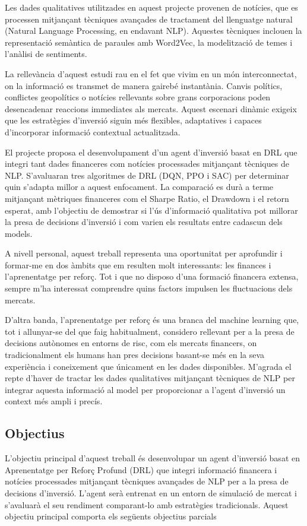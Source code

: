 \documentclass[12pt,a4paper,twoside]{book}
\begin{document}
Les dades qualitatives utilitzades en aquest projecte provenen de notícies, que es processen mitjançant tècniques avançades de tractament del llenguatge natural (Natural Language Processing, en endavant NLP). Aquestes tècniques inclouen la representació semàntica de paraules amb Word2Vec, la modelització de temes i l'anàlisi de sentiments.

La rellevància d'aquest estudi rau en el fet que vivim en un món interconnectat, on la informació es transmet de manera gairebé instantània. Canvis polítics, conflictes geopolítics o notícies rellevants sobre grans corporacions poden desencadenar reaccions immediates als mercats. Aquest escenari dinàmic exigeix que les estratègies d'inversió siguin més flexibles, adaptatives i capaces d'incorporar informació contextual actualitzada.

El projecte proposa el desenvolupament d'un agent d'inversió basat en DRL que integri tant dades financeres com notícies processades mitjançant tècniques de NLP. S'avaluaran tres algoritmes de DRL (DQN, PPO i SAC) per determinar quin s'adapta millor a aquest enfocament. La comparació es durà a terme mitjançant mètriques financeres com el Sharpe Ratio, el Drawdown i el retorn esperat, amb l'objectiu de demostrar si l'ús d'informació qualitativa pot millorar la presa de decisions d'inversió i com varien els resultats entre cadascun dels models.

A nivell personal, aquest treball representa una oportunitat per aprofundir i formar-me en dos àmbits que em resulten molt interessants: les finances i l'aprenentatge per reforç. Tot i que no disposo d'una formació financera extensa, sempre m'ha interessat comprendre quins factors impulsen les fluctuacions dels mercats.

D'altra banda, l'aprenentatge per reforç és una branca del machine learning que, tot i allunyar-se del que faig habitualment, considero rellevant per a la presa de decisions autònomes en entorns de risc, com els mercats financers, on tradicionalment els humans han pres decisions basant-se més en la seva experiència i coneixement que únicament en les dades disponibles. M'agrada el repte d'haver de tractar les dades qualitatives mitjançant tècniques de NLP per integrar aquesta informació al model per proporcionar a l'agent d'inversió un context més ampli i precís.

\subsection{Objectius}
L'objectiu principal d'aquest treball és desenvolupar un agent d'inversió basat en Aprenentatge per Reforç Profund (DRL) que integri informació financera i notícies processades mitjançant tècniques avançades de NLP per a la presa de decisions d'inversió. L'agent serà entrenat en un entorn de simulació de mercat i s'avaluarà el seu rendiment comparant-lo amb estratègies tradicionals. Aquest objectiu principal comporta els següents objectius parcials
\end{document}
